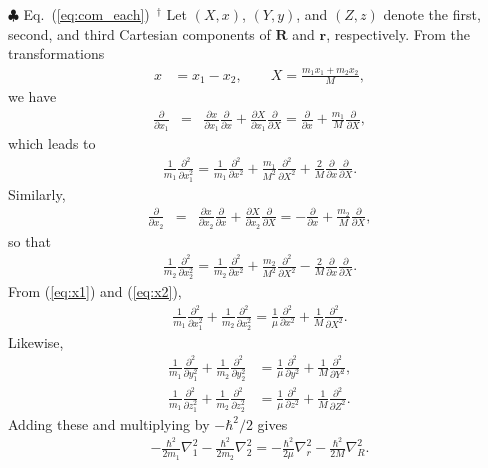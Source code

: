 \begin{itembox}{$\clubsuit$ Eq.~(\ref{eq:com_each}) $\,^\dagger$}
\footnotesize
Let $(X,x)$, $(Y,y)$, and $(Z,z)$ denote the first, second, and third Cartesian components of $\boldsymbol{R}$ and $\boldsymbol{r}$, respectively.  
From the transformations
\begin{align}
x &= x_1 - x_2, \qquad
X = \frac{m_1 x_1 + m_2 x_2}{M}, \nonumber
\end{align}
we have
\begin{eqnarray}
\frac{\partial}{\partial x_1} &=& \frac{\partial x}{\partial x_1} \frac{\partial}{\partial x} +
\frac{\partial X}{\partial x_1} \frac{\partial}{\partial X}
=  \frac{\partial}{\partial x} +  \frac{m_1}{M}\frac{\partial}{\partial X},
\end{eqnarray}
which leads to
\begin{align}
\label{eq:x1}
\frac{1}{m_1}\frac{\partial^2}{\partial x_1^2} =
\frac{1}{m_1} \frac{\partial^2}{\partial x^2} + \frac{m_1}{M^2} \frac{\partial^2}{\partial X^2}
+ \frac{2}{M}\frac{\partial}{\partial x}\frac{\partial}{\partial X}.
\end{align}
Similarly,
\begin{eqnarray}
\frac{\partial}{\partial x_2} &=& \frac{\partial x}{\partial x_2} \frac{\partial}{\partial x} +
\frac{\partial X}{\partial x_2} \frac{\partial}{\partial X}
=  - \frac{\partial}{\partial x} +  \frac{m_2}{M}\frac{\partial}{\partial X},
\end{eqnarray}
so that
\begin{align}
\label{eq:x2}
\frac{1}{m_2}\frac{\partial^2}{\partial x_2^2} =
\frac{1}{m_2} \frac{\partial^2}{\partial x^2} + \frac{m_2}{M^2} \frac{\partial^2}{\partial X^2}
- \frac{2}{M}\frac{\partial}{\partial x}\frac{\partial}{\partial X}.
\end{align}
From (\ref{eq:x1}) and (\ref{eq:x2}),
\begin{align}
\frac{1}{m_1} \frac{\partial^2}{\partial x_1^2} +  \frac{1}{m_2} \frac{\partial^2}{\partial x_2^2} =
\frac{1}{\mu}\frac{\partial^2}{\partial x^2} + \frac{1}{M}\frac{\partial^2}{\partial X^2}.
\end{align}
Likewise,
\begin{align}
\frac{1}{m_1} \frac{\partial^2}{\partial y_1^2} +  \frac{1}{m_2} \frac{\partial^2}{\partial y_2^2} &=
\frac{1}{\mu}\frac{\partial^2}{\partial y^2} + \frac{1}{M}\frac{\partial^2}{\partial Y^2}, \\
\frac{1}{m_1} \frac{\partial^2}{\partial z_1^2} +  \frac{1}{m_2} \frac{\partial^2}{\partial z_2^2} &=
\frac{1}{\mu}\frac{\partial^2}{\partial z^2} + \frac{1}{M}\frac{\partial^2}{\partial Z^2}.
\end{align}
Adding these and multiplying by $- \hbar^2/2$ gives
\begin{align}
- \frac{\hbar^2}{2 m_1} \nabla_{1}^2  - \frac{\hbar^2}{2 m_2} \nabla_{2}^2 
= - \frac{\hbar^2}{2 \mu} \nabla_{r}^2  - \frac{\hbar^2}{2 M} \nabla_{R}^2 .
\end{align}
\end{itembox}


